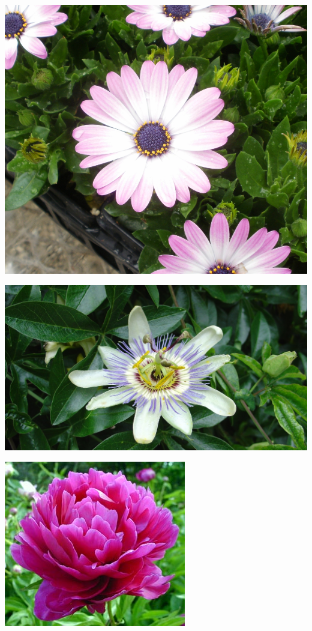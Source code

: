 \documentclass{article}
\begin{document}
\begin{center}
\includegraphics[height=0.9\textheight, angle=90]{../Ostespermum2.jpg}
\end{center}
\newpage

\begin{center}
\includegraphics[height=0.9\textheight, angle=90]{../Passiflora_(PassionFlower).jpg}
\end{center}
\newpage

\begin{center}
\includegraphics[height=0.9\textheight, angle=90]{../Peony_red.jpg}
\end{center}
\newpage
\end{document}
